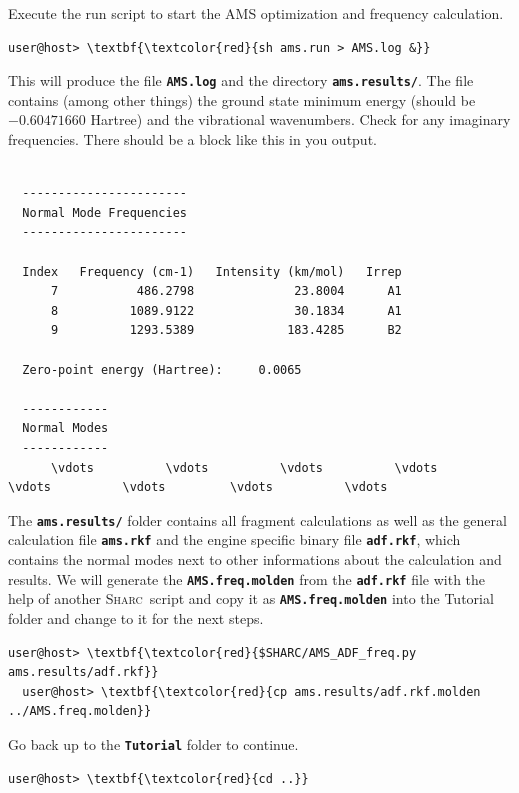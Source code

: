 \documentclass[a4paper,11pt,DIV=15,openany]{scrbook}
\newcommand{\sharc}{\textsc{Sharc}}
\newcommand{\ttt}[1]{\textbf{\texttt{#1}}}
\begin{document}
\normalsize

Execute the run script to start the \textsc{AMS} optimization and frequency calculation.
\begin{Verbatim}[commandchars=\\\{\}]
user@host> \textbf{\textcolor{red}{sh ams.run > AMS.log &}}
\end{Verbatim}
This will produce the file \ttt{AMS.log} and the directory \ttt{ams.results/}. 
The file contains (among other things) the ground state minimum energy (should be $-0.60471660$ Hartree) and the vibrational wavenumbers. 
Check for any imaginary frequencies.
There should be a block like this in you output.
\begin{oframed}
\footnotesize\begin{Verbatim}[commandchars=\\\{\}]

  -----------------------
  Normal Mode Frequencies
  -----------------------
 
  Index   Frequency (cm-1)   Intensity (km/mol)   Irrep
      7           486.2798              23.8004      A1
      8          1089.9122              30.1834      A1
      9          1293.5389             183.4285      B2
 
  Zero-point energy (Hartree):     0.0065
 
  ------------
  Normal Modes
  ------------
      \vdots          \vdots          \vdots          \vdots         \vdots          \vdots         \vdots          \vdots
\end{Verbatim}
\end{oframed}

\normalsize
The \ttt{ams.results/} folder contains all fragment calculations as well as the general calculation file \ttt{ams.rkf} and the engine specific binary file \ttt{adf.rkf}, which contains the normal modes next to other informations about the calculation and results. 
We will generate the \ttt{AMS.freq.molden} from the \ttt{adf.rkf} file with the help of another \sharc\ script and copy it as \ttt{AMS.freq.molden} into the Tutorial folder and change to it for the next steps.

\begin{Verbatim}[commandchars=\\\{\}]
  user@host> \textbf{\textcolor{red}{$SHARC/AMS_ADF_freq.py ams.results/adf.rkf}}
  user@host> \textbf{\textcolor{red}{cp ams.results/adf.rkf.molden ../AMS.freq.molden}}
\end{Verbatim}
Go back up to the \ttt{Tutorial} folder to continue.
\begin{Verbatim}[commandchars=\\\{\}]
user@host> \textbf{\textcolor{red}{cd ..}}
\end{Verbatim}
\end{document}
